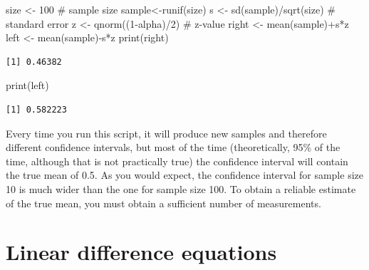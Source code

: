 \documentclass[
  letterpaper,
  DIV=11,
  numbers=noendperiod]{scrreprt}
\newenvironment{Shaded}{\begin{snugshade}}{\end{snugshade}}
\newcommand{\CommentTok}[1]{\textcolor[rgb]{0.37,0.37,0.37}{#1}}
\newcommand{\DecValTok}[1]{\textcolor[rgb]{0.68,0.00,0.00}{#1}}
\newcommand{\FunctionTok}[1]{\textcolor[rgb]{0.28,0.35,0.67}{#1}}
\newcommand{\NormalTok}[1]{\textcolor[rgb]{0.00,0.23,0.31}{#1}}
\newcommand{\OtherTok}[1]{\textcolor[rgb]{0.00,0.23,0.31}{#1}}
\newcommand{\SpecialCharTok}[1]{\textcolor[rgb]{0.37,0.37,0.37}{#1}}
\begin{document}
\begin{Shaded}
\begin{Highlighting}[]
\NormalTok{size }\OtherTok{\textless{}{-}} \DecValTok{100} \CommentTok{\# sample size}
\NormalTok{sample}\OtherTok{\textless{}{-}}\FunctionTok{runif}\NormalTok{(size)}
\NormalTok{s }\OtherTok{\textless{}{-}} \FunctionTok{sd}\NormalTok{(sample)}\SpecialCharTok{/}\FunctionTok{sqrt}\NormalTok{(size) }\CommentTok{\# standard error}
\NormalTok{z }\OtherTok{\textless{}{-}} \FunctionTok{qnorm}\NormalTok{((}\DecValTok{1}\SpecialCharTok{{-}}\NormalTok{alpha)}\SpecialCharTok{/}\DecValTok{2}\NormalTok{) }\CommentTok{\# z{-}value}
\NormalTok{right }\OtherTok{\textless{}{-}} \FunctionTok{mean}\NormalTok{(sample)}\SpecialCharTok{+}\NormalTok{s}\SpecialCharTok{*}\NormalTok{z}
\NormalTok{left }\OtherTok{\textless{}{-}} \FunctionTok{mean}\NormalTok{(sample)}\SpecialCharTok{{-}}\NormalTok{s}\SpecialCharTok{*}\NormalTok{z}
\FunctionTok{print}\NormalTok{(right)}
\end{Highlighting}
\end{Shaded}

\begin{verbatim}
[1] 0.46382
\end{verbatim}

\begin{Shaded}
\begin{Highlighting}[]
\FunctionTok{print}\NormalTok{(left)}
\end{Highlighting}
\end{Shaded}

\begin{verbatim}
[1] 0.582223
\end{verbatim}

Every time you run this script, it will produce new samples and
therefore different confidence intervals, but most of the time
(theoretically, 95\% of the time, although that is not practically true)
the confidence interval will contain the true mean of 0.5. As you would
expect, the confidence interval for sample size 10 is much wider than
the one for sample size 100. To obtain a reliable estimate of the true
mean, you must obtain a sufficient number of measurements.


\hypertarget{linear-difference-equations}{%
\chapter{Linear difference
equations}\label{linear-difference-equations}}
\end{document}

